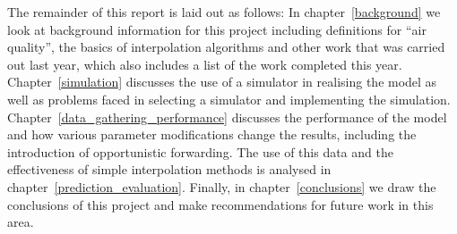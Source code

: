     The remainder of this report is laid out as follows: In chapter~\ref{background} we look at background information for this project including definitions for ``air quality'', the basics of interpolation algorithms and other work that was carried out last year, which also includes a list of the work completed this year. Chapter~\ref{simulation} discusses the use of a simulator in realising the model as well as problems faced in selecting a simulator and implementing the simulation. Chapter~\ref{data_gathering_performance} discusses the performance of the model and how various parameter modifications change the results, including the introduction of opportunistic forwarding. The use of this data and the effectiveness of simple interpolation methods is analysed in chapter~\ref{prediction_evaluation}. Finally, in chapter~\ref{conclusions} we draw the conclusions of this project and make recommendations for future work in this area.
